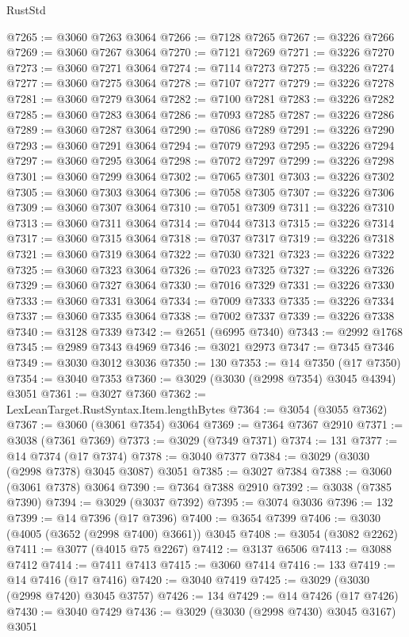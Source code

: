 \begin{lexlean}{RustStd}
\begin{coremodule}
@7265 := @3060 @7263 @3064
@7266 := @7128 @7265
@7267 := @3226 @7266
@7269 := @3060 @7267 @3064
@7270 := @7121 @7269
@7271 := @3226 @7270
@7273 := @3060 @7271 @3064
@7274 := @7114 @7273
@7275 := @3226 @7274
@7277 := @3060 @7275 @3064
@7278 := @7107 @7277
@7279 := @3226 @7278
@7281 := @3060 @7279 @3064
@7282 := @7100 @7281
@7283 := @3226 @7282
@7285 := @3060 @7283 @3064
@7286 := @7093 @7285
@7287 := @3226 @7286
@7289 := @3060 @7287 @3064
@7290 := @7086 @7289
@7291 := @3226 @7290
@7293 := @3060 @7291 @3064
@7294 := @7079 @7293
@7295 := @3226 @7294
@7297 := @3060 @7295 @3064
@7298 := @7072 @7297
@7299 := @3226 @7298
@7301 := @3060 @7299 @3064
@7302 := @7065 @7301
@7303 := @3226 @7302
@7305 := @3060 @7303 @3064
@7306 := @7058 @7305
@7307 := @3226 @7306
@7309 := @3060 @7307 @3064
@7310 := @7051 @7309
@7311 := @3226 @7310
@7313 := @3060 @7311 @3064
@7314 := @7044 @7313
@7315 := @3226 @7314
@7317 := @3060 @7315 @3064
@7318 := @7037 @7317
@7319 := @3226 @7318
@7321 := @3060 @7319 @3064
@7322 := @7030 @7321
@7323 := @3226 @7322
@7325 := @3060 @7323 @3064
@7326 := @7023 @7325
@7327 := @3226 @7326
@7329 := @3060 @7327 @3064
@7330 := @7016 @7329
@7331 := @3226 @7330
@7333 := @3060 @7331 @3064
@7334 := @7009 @7333
@7335 := @3226 @7334
@7337 := @3060 @7335 @3064
@7338 := @7002 @7337
@7339 := @3226 @7338
@7340 := @3128 @7339
@7342 := @2651 (@6995 @7340)
@7343 := @2992 @1768
@7345 := @2989 @7343 @4969
@7346 := @3021 @2973
@7347 := @7345 @7346
@7349 := @3030 @3012 @3036
@7350 := 130
@7353 := @14 @7350 (@17 @7350)
@7354 := @3040 @7353
@7360 := @3029 (@3030 (@2998 @7354) @3045 @4394) @3051
@7361 := @3027 @7360
@7362 := LexLeanTarget.RustSyntax.Item.lengthBytes
@7364 := @3054 (@3055 @7362)
@7367 := @3060 (@3061 @7354) @3064
@7369 := @7364 @7367 @2910
@7371 := @3038 (@7361 @7369)
@7373 := @3029 (@7349 @7371)
@7374 := 131
@7377 := @14 @7374 (@17 @7374)
@7378 := @3040 @7377
@7384 := @3029 (@3030 (@2998 @7378) @3045 @3087) @3051
@7385 := @3027 @7384
@7388 := @3060 (@3061 @7378) @3064
@7390 := @7364 @7388 @2910
@7392 := @3038 (@7385 @7390)
@7394 := @3029 (@3037 @7392)
@7395 := @3074 @3036
@7396 := 132
@7399 := @14 @7396 (@17 @7396)
@7400 := @3654 @7399
@7406 := @3030 (@4005 (@3652 (@2998 @7400) @3661)) @3045
@7408 := @3054 (@3082 @2262)
@7411 := @3077 (@4015 @75 @2267)
@7412 := @3137 @6506
@7413 := @3088 @7412
@7414 := @7411 @7413
@7415 := @3060 @7414
@7416 := 133
@7419 := @14 @7416 (@17 @7416)
@7420 := @3040 @7419
@7425 := @3029 (@3030 (@2998 @7420) @3045 @3757)
@7426 := 134
@7429 := @14 @7426 (@17 @7426)
@7430 := @3040 @7429
@7436 := @3029 (@3030 (@2998 @7430) @3045 @3167) @3051

\end{coremodule}
\end{lexlean}
